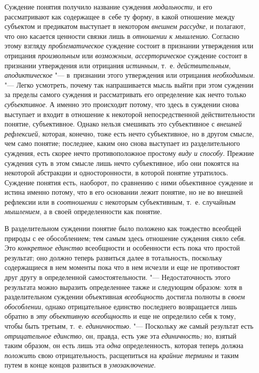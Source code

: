 Суждение понятия получило название суждения
{\em модальности}, и его
рассматривают как содержащее в~себе ту форму, в какой отношение между
субъектом и предикатом выступает в некотором
{\em внешнем рассудке}, и
полагают, что оно касается ценности связки лишь в
{\em отношении к мышлению}.
Согласно этому взгляду
{\em проблематическое}
суждение состоит в признании утверждения или отрицания
{\em произвольным} или
{\em возможным},
{\em ассерторическое}
суждение состоит в признании утверждения или отрицания
{\em истинным}, т.~е.
{\em действительным},
{\em аподиктическое} "--- в~признании этого утверждения или отрицания
{\em необходимым}. "---
Легко усмотреть, почему так напрашивается мысль выйти при
этом суждении за пределы самого суждения и рассматривать его определение
как нечто только {\em субъективное}.
А именно это происходит потому, что здесь в суждении снова
выступает и входит в отношение к некоторой непосредственной
действительности понятие, субъективное. Однако нельзя смешивать это
субъективное с {\em внешней
рефлексией}, которая, конечно, тоже есть нечто субъективное,
но в другом смысле, чем само понятие; последнее, каким оно снова выступает
из разделительного суждения, есть скорее нечто противоположное простому
{\em виду и способу}.
Прежние суждения суть в этом смысле лишь нечто субъективное,
ибо они покоятся на некоторой абстракции и односторонности, в которой
понятие утратилось. Суждение понятия есть, наоборот, по сравнению с ними
объективное суждение и истина именно потому, что в его основании лежит
понятие, но не во внешней рефлексии или в
{\em соотношении} с
некоторым субъективным, т.~е. случайным
{\em мышлением}, а в
своей определенности как понятие.

В разделительном суждении понятие было положено как тождество
всеобщей природы с ее обособлением; тем самым здесь отношение суждения
сняло себя. Это {\em конкретное
единство} всеобщности и особенности есть пока что простой
результат; оно должно теперь развиться далее в тотальность, поскольку
содержащиеся в нем моменты пока что в нем исчезли и еще не противостоят
друг другу в определенной самостоятельности. "---
Недостаточность этого результата можно выразить определеннее
также и следующим образом: хотя в разделительном суждении объективная
{\em всеобщность}
достигла полноты в
{\em своем обособлении},
однако отрицательное единство последнего возвращается лишь
обратно в {\em эту объективную
всеобщность} и еще не определило себя к тому, чтобы быть
третьим, т.~е. {\em единичностью}. "---
Поскольку же самый результат есть
{\em отрицательное единство},
он, правда, есть уже эта
{\em единичность;} но,
взятый таким образом, он есть лишь эта
{\em одна}
определенность, которая теперь должна
{\em положить} свою
отрицательность, расщепиться на
{\em крайние термины} и
таким путем в конце концов развиться в
{\em умозаключение}.

